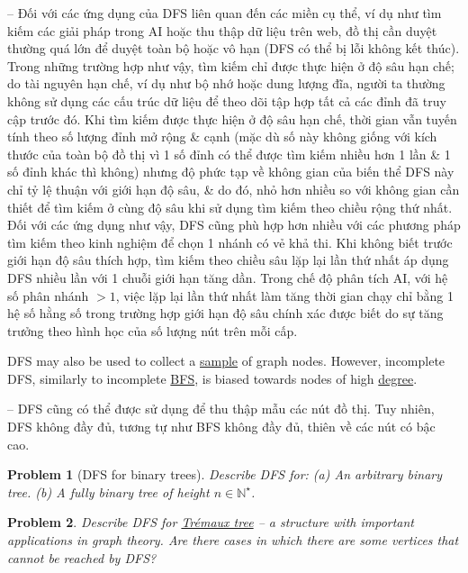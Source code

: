 \documentclass[oneside]{book}
\newtheorem{problem}{Problem}
\begin{document}
-- Đối với các ứng dụng của DFS liên quan đến các miền cụ thể, ví dụ như tìm kiếm các giải pháp trong AI hoặc thu thập dữ liệu trên web, đồ thị cần duyệt thường quá lớn để duyệt toàn bộ hoặc vô hạn (DFS có thể bị lỗi không kết thúc). Trong những trường hợp như vậy, tìm kiếm chỉ được thực hiện ở độ sâu hạn chế; do tài nguyên hạn chế, ví dụ như bộ nhớ hoặc dung lượng đĩa, người ta thường không sử dụng các cấu trúc dữ liệu để theo dõi tập hợp tất cả các đỉnh đã truy cập trước đó. Khi tìm kiếm được thực hiện ở độ sâu hạn chế, thời gian vẫn tuyến tính theo số lượng đỉnh mở rộng \& cạnh (mặc dù số này không giống với kích thước của toàn bộ đồ thị vì 1 số đỉnh có thể được tìm kiếm nhiều hơn 1 lần \& 1 số đỉnh khác thì không) nhưng độ phức tạp về không gian của biến thể DFS này chỉ tỷ lệ thuận với giới hạn độ sâu, \& do đó, nhỏ hơn nhiều so với không gian cần thiết để tìm kiếm ở cùng độ sâu khi sử dụng tìm kiếm theo chiều rộng thứ nhất. Đối với các ứng dụng như vậy, DFS cũng phù hợp hơn nhiều với các phương pháp tìm kiếm theo kinh nghiệm để chọn 1 nhánh có vẻ khả thi. Khi không biết trước giới hạn độ sâu thích hợp, tìm kiếm theo chiều sâu lặp lại lần thứ nhất áp dụng DFS nhiều lần với 1 chuỗi giới hạn tăng dần. Trong chế độ phân tích AI, với hệ số phân nhánh $> 1$, việc lặp lại lần thứ nhất làm tăng thời gian chạy chỉ bằng 1 hệ số hằng số trong trường hợp giới hạn độ sâu chính xác được biết do sự tăng trưởng theo hình học của số lượng nút trên mỗi cấp.

DFS may also be used to collect a \href{https://en.wikipedia.org/wiki/Sample_(statistics)}{sample} of graph nodes. However, incomplete DFS, similarly to incomplete \href{https://en.wikipedia.org/wiki/Breadth-first_search#Bias_towards_nodes_of_high_degree}{BFS}, is biased towards nodes of high \href{https://en.wikipedia.org/wiki/Degree_(graph_theory)}{degree}.

-- DFS cũng có thể được sử dụng để thu thập mẫu các nút đồ thị. Tuy nhiên, DFS không đầy đủ, tương tự như BFS không đầy đủ, thiên về các nút có bậc cao.

\begin{problem}[DFS for binary trees]
	Describe DFS for: (a) An arbitrary binary tree. (b) A fully binary tree of height $n\in\mathbb{N}^\star$.
\end{problem}

\begin{problem}
	Describe DFS for \href{https://en.wikipedia.org/wiki/Tr%C3%A9maux_tree}{Tr\'emaux tree} -- a structure with important applications in graph theory. Are there cases in which there are some vertices that cannot be reached by DFS?
\end{problem}
\end{document}
